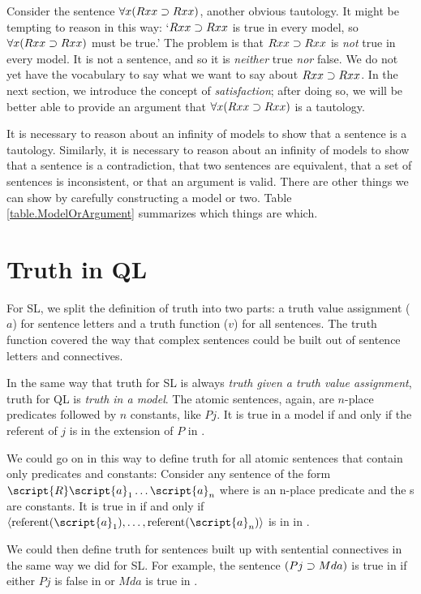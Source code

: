 Consider the sentence $\forall x(Rxx\supset Rxx)$, another obvious tautology. It might be tempting to reason in this way: `$Rxx\supset Rxx$ is true in every model, so $\forall x(Rxx\supset Rxx)$ must be true.' The problem is that $Rxx\supset Rxx$ is \emph{not} true in every model. It is not a sentence, and so it is \emph{neither} true \emph{nor} false. We do not yet have the vocabulary to say what we want to say about $Rxx\supset Rxx$. In the next section, we introduce the concept of \emph{satisfaction}; after doing so, we will be better able to provide an argument that $\forall x(Rxx\supset Rxx)$ is a tautology.

It is necessary to reason about an infinity of models to show that a sentence is a tautology. Similarly, it is necessary to reason about an infinity of models to show that a sentence is a contradiction, that two sentences are equivalent, that a set of sentences is inconsistent, or that an argument is valid. There are other things we can show by carefully constructing a model or two. Table \ref{table.ModelOrArgument} summarizes which things are which.






\section{Truth in QL}
\label{sec.TruthInQL}
For SL, we split the definition of truth into two parts: a truth value assignment ($a$) for sentence letters and a truth function ($v$) for all sentences. The truth function covered the way that complex sentences could be built out of sentence letters and connectives.

In the same way that truth for SL is always \emph{truth given a truth value assignment}, truth for QL is \emph{truth in a model}. The atomic sentences, again, are $n$-place predicates followed by $n$ constants, like $Pj$. It is true in a model  if and only if the referent of $j$ is in the extension of $P$ in .

We could go on in this way to define truth for all atomic sentences that contain only predicates and constants: Consider any sentence of the form $\script{R}\script{a}_1\ldots\script{a}_n$ where  is an n-place predicate and the s are constants. It is true in  if and only if ${\langle}\referent{\script{a}_1},\ldots,\referent{\script{a}_n}{\rangle}$ is in  in .

We could then define truth for sentences built up with sentential connectives in the same way we did for SL. For example, the sentence $(Pj \supset Mda)$ is true in  if either $Pj$ is false in  or $Mda$ is true in .

